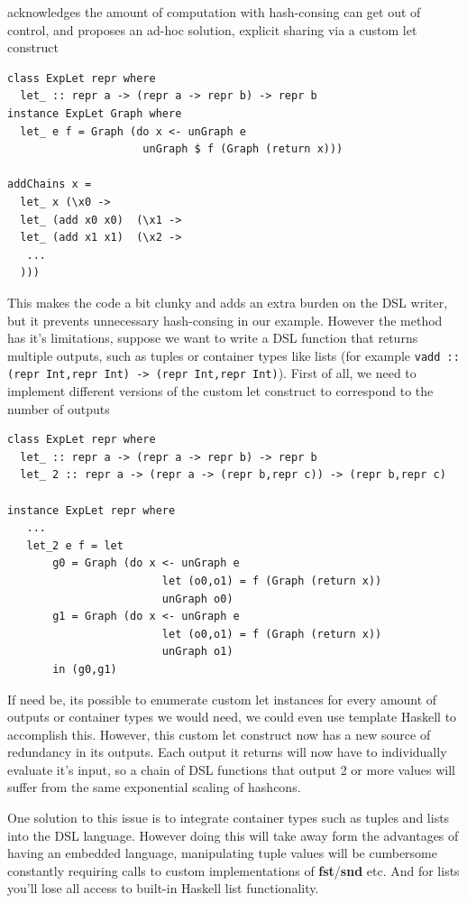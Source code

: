 \documentclass[runningheads]{llncs}
\begin{document}
\cite{kiselyov:sharing} acknowledges the amount of computation with hash-consing
can get out of control, and proposes an ad-hoc solution, explicit sharing via a
custom let construct
\begin{verbatim}
class ExpLet repr where
  let_ :: repr a -> (repr a -> repr b) -> repr b
instance ExpLet Graph where
  let_ e f = Graph (do x <- unGraph e
                     unGraph $ f (Graph (return x)))

addChains x =
  let_ x (\x0 ->
  let_ (add x0 x0)  (\x1 ->
  let_ (add x1 x1)  (\x2 ->
   ...
  )))
\end{verbatim}
This makes the code a bit clunky and adds an extra burden on the DSL writer, but
it prevents unnecessary hash-consing in our example. However the method has it's
limitations, suppose we want to write a DSL function that returns multiple
outputs, such as tuples or container types like lists (for example
\texttt{vadd :: (repr Int,repr Int) -> (repr Int,repr Int)}). %
First of all, we need to implement different versions of the custom let construct to
correspond to the number of outputs
\begin{verbatim}
class ExpLet repr where
  let_ :: repr a -> (repr a -> repr b) -> repr b
  let_ 2 :: repr a -> (repr a -> (repr b,repr c)) -> (repr b,repr c)

instance ExpLet repr where
   ...
   let_2 e f = let
       g0 = Graph (do x <- unGraph e
                        let (o0,o1) = f (Graph (return x))
                        unGraph o0)
       g1 = Graph (do x <- unGraph e
                        let (o0,o1) = f (Graph (return x))
                        unGraph o1)
       in (g0,g1)
\end{verbatim}
If need be, its possible to enumerate custom let instances for every amount of
outputs or container types we would need, we could even use template Haskell to
accomplish this. However, this custom let construct now has a new source of
redundancy in its outputs. Each output it returns will now have to individually
evaluate it's input, so a chain of DSL functions that output 2 or more values
will suffer from the same exponential scaling of hashcons.

One solution to this issue is to integrate container types such as tuples and
lists into the DSL language. However doing this will take away form the
advantages of having an embedded language, manipulating tuple values will be
cumbersome constantly requiring calls to custom implementations of {\bf
  fst}/{\bf snd} etc. And for lists you'll lose all access to built-in Haskell
list functionality.
\end{document}
